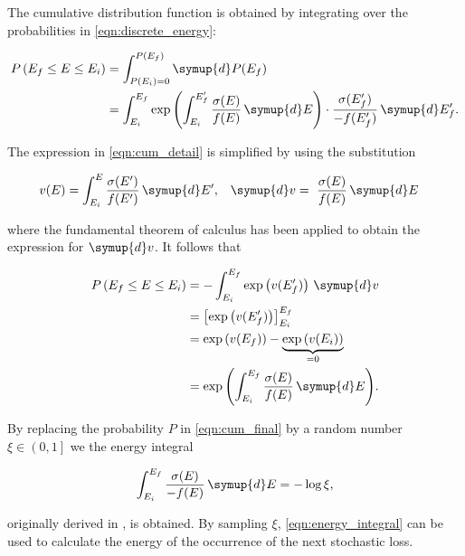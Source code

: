 The cumulative distribution function is obtained by integrating over the probabilities in \ref{eqn:discrete_energy}:

\begin{equation}
	\label{eqn:cum_detail}
	\begin{split}
	P\left(E_f \leq E \leq E_i\right) &= \int_{P(E_i)=0}^{P(E_f)} \symup{d}P(E_f)\\
	&= \int_{E_i}^{E_f} \exp \left( \int_{E_i}^{E_f'} \frac{\sigma(E)}{ f(E) } \, \symup{d}E \right) \cdot \frac{\sigma(E'_f)}{-f(E'_f)} \, \symup{d}E'_f.
	\end{split}
\end{equation}

The expression in \ref{eqn:cum_detail} is simplified by using the substitution

\begin{align}
	v(E) &= \int_{E_i}^{E} \frac{\sigma(E')}{f(E')} \, \symup{d}E', & \symup{d}v &= \frac{\sigma(E)}{f(E)} \, \symup{d}E
\end{align}

where the fundamental theorem of calculus has been applied to obtain the expression for $\symup{d}v$.
It follows that

\begin{equation}
	\label{eqn:cum_final}
	\begin{split}
	P\left(E_f \leq E \leq E_i\right) &= - \int_{E_i}^{E_f} \exp \left( v(E_f') \right) \, \symup{d}v \\
	&= \left[ \exp \left( v(E'_f) \right) \right]_{E_i}^{E_f}\\
	&= \exp\left( v(E_f) \right) - \underbrace{\exp \left( v(E_i) \right)}_{= 0} \\
	&= \exp{\left( \int_{E_i}^{E_f} \frac{\sigma(E)}{f(E)} \, \symup{d}E \right)}.
	\end{split}
\end{equation}

By replacing the probability $P$ in \ref{eqn:cum_final} by a random number $\xi \in \left(0, 1\right]$ we the energy integral

\begin{equation}
	\label{eqn:energy_integral}
	\int_{E_i}^{E_f} \frac{\sigma(E)}{-f(E)} \, \symup{d}E = - \log{\xi},
\end{equation}

originally derived in \cite{chirkin2004propagating}, is obtained. 
By sampling $\xi$, \ref{eqn:energy_integral} can be used to calculate the energy of the occurrence of the next stochastic loss.

